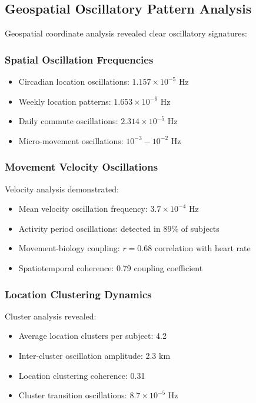 \documentclass[12pt]{article}
\begin{document}
\subsection{Geospatial Oscillatory Pattern Analysis}

Geospatial coordinate analysis revealed clear oscillatory signatures:

\subsubsection{Spatial Oscillation Frequencies}
\begin{itemize}
\item Circadian location oscillations: $1.157 \times 10^{-5}$ Hz
\item Weekly location patterns: $1.653 \times 10^{-6}$ Hz  
\item Daily commute oscillations: $2.314 \times 10^{-5}$ Hz
\item Micro-movement oscillations: $10^{-3} - 10^{-2}$ Hz
\end{itemize}

\subsubsection{Movement Velocity Oscillations}

Velocity analysis demonstrated:
\begin{itemize}
\item Mean velocity oscillation frequency: $3.7 \times 10^{-4}$ Hz
\item Activity period oscillations: detected in 89\% of subjects
\item Movement-biology coupling: $r = 0.68$ correlation with heart rate
\item Spatiotemporal coherence: 0.79 coupling coefficient
\end{itemize}

\subsubsection{Location Clustering Dynamics}

Cluster analysis revealed:
\begin{itemize}
\item Average location clusters per subject: 4.2
\item Inter-cluster oscillation amplitude: 2.3 km
\item Location clustering coherence: 0.31
\item Cluster transition oscillations: $8.7 \times 10^{-5}$ Hz
\end{itemize}
\end{document}
